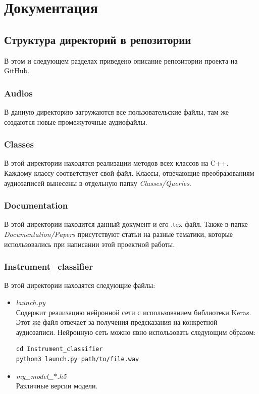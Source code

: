 \documentclass[14pt,a4paper]{article}
\begin{document}
\newpage

\section[Документация]{\huge Документация}
\subsection{Структура директорий в репозитории}

В этом и следующем разделах приведено описание репозитории проекта на GitHub.

\subsubsection*{Audios}

В данную директорию загружаются все пользовательские файлы, там же создаются новые промежуточные аудиофайлы.

\subsubsection*{Classes}

В этой директории находятся реализации методов всех классов на C++. Каждому классу соответствует свой файл. Классы, отвечающие преобразованиям аудиозаписей вынесены в отдельную папку \textit{Classes/Queries}.

\subsubsection*{Documentation}

В этой директории находится данный документ и его .tex файл. Также в папке \textit{Documentation/Papers} присутствуют статьи на разные тематики, которые использовались при написании этой проектной работы.

\subsubsection*{Instrument\_classifier}
\lstset{
  language=bash,
  basicstyle=\ttfamily
}

В этой директории находятся следующие файлы:
\begin{itemize}
\item \textit{launch.py} \\
Содержит реализацию нейронной сети с использованием библиотеки Keras. Этот же файл отвечает за получения предсказания на конкретной аудиозаписи. Нейронную сеть можно явно использовать следующим образом:
\begin{lstlisting}
cd Instrument_classifier
python3 launch.py path/to/file.wav
\end{lstlisting}
\item \textit{my\_model\_$\ast$.h5} \\
Различные версии модели.
\end{itemize}
\end{document}
